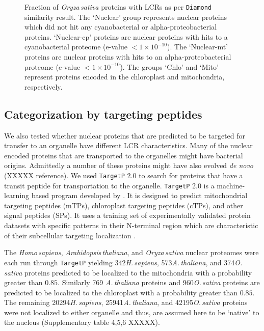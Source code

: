 \documentclass[a4paper,12pt]{article}
\newcommand{\arab}{\mbox{\textit{Arabidopsis\,thaliana}}\xspace}
\newcommand{\ath}{\mbox{\textit{A.\,thaliana}}\xspace}
\newcommand{\oryz}{\mbox{\textit{Oryza\,sativa}}\xspace}
\newcommand{\osa}{\mbox{\textit{O.\,sativa}}\xspace}
\newcommand{\homo}{\mbox{\textit{Homo\,sapiens}}\xspace}
\newcommand{\hsa}{\mbox{\textit{H.\,sapiens}}\xspace}
\newcommand{\tget}{\mbox{\texttt{TargetP}}\xspace}
\renewcommand{\diamond}{\mbox{\texttt{Diamond}}\xspace}
\newcommand{\missing}{{\color{red}XXXXX}\xspace}
\newcommand{\humanNucNumberTarget}{20294\xspace}
\newcommand{\humanNucMitoNoTarget}{342\xspace}
\newcommand{\arabNucNumberTarget}{25941\xspace}
\newcommand{\arabNucMitoNoTarget}{573\xspace}
\newcommand{\arabNucChloNoTarget}{769\xspace}
\newcommand{\oryzNucNumberTarget}{42195\xspace}
\newcommand{\oryzNucMitoNoTarget}{374\xspace}
\newcommand{\oryzNucChloNoTarget}{960\xspace}
\begin{document}
\begin{multicols}{2}
\begin{figure*}
    \centering\parbox{0.9\textwidth}{\footnotesize Fraction of \oryz
    proteins with LCRs as per \diamond similarity result.  The `Nuclear'
    group represents nuclear proteins which did not hit any cyanobacterial
    or alpha-proteobacterial proteins. `Nuclear-cp' proteins are nuclear
    proteins with hits to a cyanobacterial proteome (e-value $< 1 \times
    10^{-10}$). The `Nuclear-mt' proteins are nuclear proteins with hits to
    an alpha-proteobacterial proteome (e-value $< 1 \times 10^{-10}$).
    The groups `Chlo' and `Mito' represent proteins encoded in the
    chloroplast and mitochondria, respectively.}

\end{figure*}


\subsection*{Categorization by targeting peptides}
We also tested whether nuclear proteins that are predicted to be targeted
for transfer to an organelle have different LCR characteristics.
Many of the nuclear encoded proteins that are transported to the
organelles might have bacterial origins.  Admittedly a number of these
proteins might have also evolved \textit{de novo} (\missing reference). We
used \tget 2.0 to search for proteins that have a transit peptide for
transportation to the organelle.  \tget 2.0 is a machine-learning based
program developed by \citet{ArmenterosEtAl2019}.  It is designed to
predict mitochondrial targeting peptides (mTPs), chloroplast targeting
peptides (cTPs), and other signal peptides (SPs). It uses a training set
of experimentally validated protein datasets with specific patterns in
their N-terminal region which are characteristic of their subcellular
targeting localization \citep{ArmenterosEtAl2019}.

The \homo, \arab, and \oryz nuclear proteomes were each run through
\tget yielding \humanNucMitoNoTarget \hsa, \arabNucMitoNoTarget \ath,
and \oryzNucMitoNoTarget \osa proteins predicted to be localized to the
mitochondria with a probability greater than $0.85$. Similarly \arabNucChloNoTarget
\ath proteins and \oryzNucChloNoTarget \osa proteins are predicted to be
localized to the chloroplast with a probability greater than $0.85$.
The remaining \humanNucNumberTarget \hsa, \arabNucNumberTarget \ath,
and \oryzNucNumberTarget \osa proteins were not localized to either
organelle and thus, are assumed here to be `native' to the nucleus
(Supplementary table 4,5,6 \missing).


\end{multicols}
\end{document}
